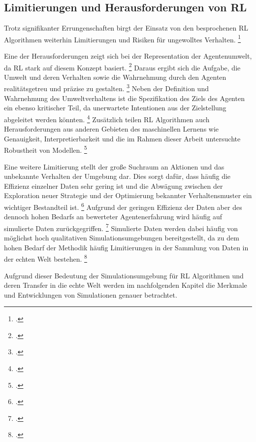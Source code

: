 \subsection{Limitierungen und Herausforderungen von RL}
Trotz signifikanter Errungenschaften birgt der Einsatz von den besprochenen RL Algorithmen weiterhin Limitierungen und Risiken für ungewolltes Verhalten. \footcite[Vgl.][S. 7]{Li.2019}

Eine der Herausforderungen zeigt sich bei der Representation der Agentenumwelt, da RL stark auf diesem Konzept basiert. \footcite[Vgl.][S. 8]{Sutton.2018}
Daraus ergibt sich die Aufgabe, die Umwelt und deren Verhalten sowie die Wahrnehmung durch den Agenten realitätsgetreu und präzise zu gestalten. \footcite[Vgl.][S. 7]{Sutton.2018}
Neben der Definition und Wahrnehmung des Umweltverhaltens ist die Spezifikation des Ziels des Agenten ein ebenso kritischer Teil, da unerwartete Intentionen aus der Zielstellung abgeleitet werden könnten. \footcite[Vgl.][S. 7]{Li.2019}
Zusätzlich teilen RL Algorithmen auch Herausforderungen aus anderen Gebieten des maschinellen Lernens wie Genauigkeit, Interpretierbarkeit und die im Rahmen dieser Arbeit untersuchte Robustheit von Modellen. \footcite[Vgl.][S. 7]{Li.2019}

Eine weitere Limitierung stellt der große Suchraum an Aktionen und das unbekannte Verhalten der Umgebung dar.
Dies sorgt dafür, dass häufig die Effizienz einzelner Daten sehr gering ist und die Abwägung zwischen der Exploration neuer Strategie und der Optimierung bekannter Verhaltensmuster ein wichtiger Bestandteil ist. \footcite[Vgl.][S. 7]{Li.2019}
Aufgrund der geringen Effizienz der Daten aber des dennoch hohen Bedarfs an bewerteter Agentenerfahrung wird häufig auf simulierte Daten zurückgegriffen. \footcite[Vgl.][S. 7]{Zhao.2020}
Simulierte Daten werden dabei häufig von möglichst hoch qualitativen Simulationsumgebungen bereitgestellt, da zu dem hohen Bedarf der Methodik häufig Limitierungen in der Sammlung von Daten in der echten Welt bestehen. \footcite[Vgl.][S. 8]{Li.2019}

Aufgrund dieser Bedeutung der Simulationsumgebung für RL Algorithmen und deren Transfer in die echte Welt werden im nachfolgenden Kapitel die Merkmale und Entwicklungen von Simulationen genauer betrachtet.